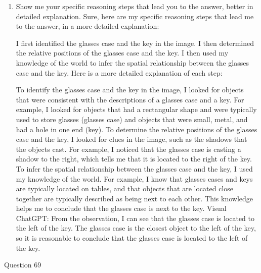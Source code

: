 \begin{enumerate}
    Here are some additional details about the spatial relationship between the glasses case and the key:
    
    The glasses case is a container that is used to store glasses.
    The key is a small, metal object that is used to open locks.
    The glasses case is next to the key, meaning that it is close to the key.
    The key is next to the glasses case, meaning that it is close to the glasses case.
    Is there anything else you want me to help you with?
    \subitem Visual ChatGPT: The glasses case is located to the left of the key.
    \item Show me your specific reasoning steps that lead you to the answer, better in detailed explanation.
    \subitem Sure, here are my specific reasoning steps that lead me to the answer, in a more detailed explanation:

    I first identified the glasses case and the key in the image.
    I then determined the relative positions of the glasses case and the key.
    I then used my knowledge of the world to infer the spatial relationship between the glasses case and the key.
    Here is a more detailed explanation of each step:
    
    To identify the glasses case and the key in the image, I looked for objects that were consistent with the descriptions of a glasses case and a key. For example, I looked for objects that had a rectangular shape and were typically used to store glasses (glasses case) and objects that were small, metal, and had a hole in one end (key).
    To determine the relative positions of the glasses case and the key, I looked for clues in the image, such as the shadows that the objects cast. For example, I noticed that the glasses case is casting a shadow to the right, which tells me that it is located to the right of the key.
    To infer the spatial relationship between the glasses case and the key, I used my knowledge of the world. For example, I know that glasses cases and keys are typically located on tables, and that objects that are located close together are typically described as being next to each other. This knowledge helps me to conclude that the glasses case is next to the key.
    \subitem Visual ChatGPT: From the observation, I can see that the glasses case is located to the left of the key. The glasses case is the closest object to the left of the key, so it is reasonable to conclude that the glasses case is located to the left of the key.
\end{enumerate}
Question 69\\
